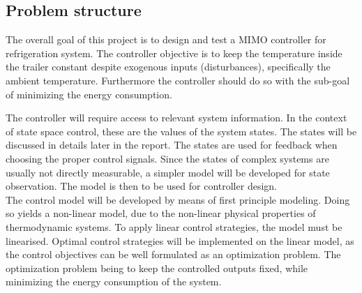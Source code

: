 \subsection{Problem structure}
The overall goal of this project is to design and test a MIMO controller for refrigeration system. The controller objective is to keep the temperature inside the trailer constant despite exogenous inputs (disturbances), specifically the ambient temperature. 
Furthermore the controller should do so with the sub-goal of minimizing the energy consumption.

The controller will require access to relevant system information. In the context of state space control, these are the values of the system states. The states will be discussed in details later in the report. The states are used for feedback when choosing the proper control signals. Since the states of complex systems are usually not directly measurable, a simpler model will be developed for state observation. The model is then to be used for controller design. \\

The control model will be developed by means of first principle modeling. Doing so yields a non-linear model, due to the non-linear physical properties of thermodynamic systems. To apply linear control strategies, the model must be linearised. Optimal control strategies will be implemented on the linear model, as the control objectives can be well formulated as an optimization problem. The optimization problem being to keep the controlled outputs fixed, while minimizing the energy consumption of the system.\\




		
